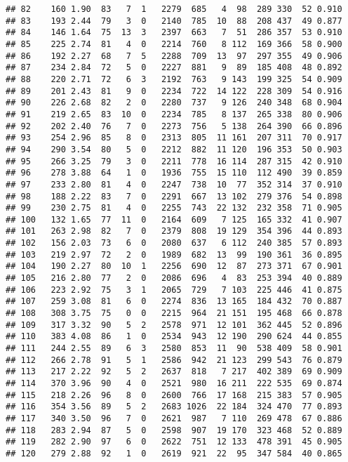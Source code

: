 \documentclass[]{article}
\begin{document}
\begin{verbatim}
## 82    160 1.90  83   7  1   2279  685   4  98  289 330  52 0.910
## 83    193 2.44  79   3  0   2140  785  10  88  208 437  49 0.877
## 84    146 1.64  75  13  3   2397  663   7  51  286 357  53 0.910
## 85    225 2.74  81   4  0   2214  760   8 112  169 366  58 0.900
## 86    192 2.27  68   7  5   2288  709  13  97  297 355  49 0.906
## 87    234 2.84  72   5  0   2227  881   9  89  185 408  48 0.892
## 88    220 2.71  72   6  3   2192  763   9 143  199 325  54 0.909
## 89    201 2.43  81   9  0   2234  722  14 122  228 309  54 0.916
## 90    226 2.68  82   2  0   2280  737   9 126  240 348  68 0.904
## 91    219 2.65  83  10  0   2234  785   8 137  265 338  80 0.906
## 92    202 2.40  76   7  0   2273  756   5 138  264 390  66 0.896
## 93    254 2.96  85   8  0   2313  805  11 161  207 311  70 0.917
## 94    290 3.54  80   5  0   2212  882  11 120  196 353  50 0.903
## 95    266 3.25  79   3  0   2211  778  16 114  287 315  42 0.910
## 96    278 3.88  64   1  0   1936  755  15 110  112 490  39 0.859
## 97    233 2.80  81   4  0   2247  738  10  77  352 314  37 0.910
## 98    188 2.22  83   7  0   2291  667  13 102  279 376  54 0.898
## 99    230 2.75  81   4  0   2255  743  22 132  232 358  71 0.905
## 100   132 1.65  77  11  0   2164  609   7 125  165 332  41 0.907
## 101   263 2.98  82   7  0   2379  808  19 129  354 396  44 0.893
## 102   156 2.03  73   6  0   2080  637   6 112  240 385  57 0.893
## 103   219 2.97  72   2  0   1989  682  13  99  190 361  36 0.895
## 104   190 2.27  80  10  1   2256  690  12  87  273 371  67 0.901
## 105   216 2.80  77   2  0   2086  696   4  83  253 394  40 0.889
## 106   223 2.92  75   3  1   2065  729   7 103  225 446  41 0.875
## 107   259 3.08  81   6  0   2274  836  13 165  184 432  70 0.887
## 108   308 3.75  75   0  0   2215  964  21 151  195 468  66 0.878
## 109   317 3.32  90   5  2   2578  971  12 101  362 445  52 0.896
## 110   383 4.08  86   1  0   2534  943  12 190  290 624  44 0.855
## 111   244 2.55  89   6  3   2580  853  11  90  538 409  58 0.901
## 112   266 2.78  91   5  1   2586  942  21 123  299 543  76 0.879
## 113   217 2.22  92   5  2   2637  818   7 217  402 389  69 0.909
## 114   370 3.96  90   4  0   2521  980  16 211  222 535  69 0.874
## 115   218 2.26  96   8  0   2600  766  17 168  215 383  57 0.905
## 116   354 3.56  89   5  2   2683 1026  22 184  324 470  77 0.893
## 117   340 3.50  96   7  0   2621  987   7 110  269 478  67 0.886
## 118   283 2.94  87   5  0   2598  907  19 170  323 468  52 0.889
## 119   282 2.90  97   6  0   2622  751  12 133  478 391  45 0.905
## 120   279 2.88  92   1  0   2619  921  22  95  347 584  40 0.865

\end{verbatim}
\end{document}
